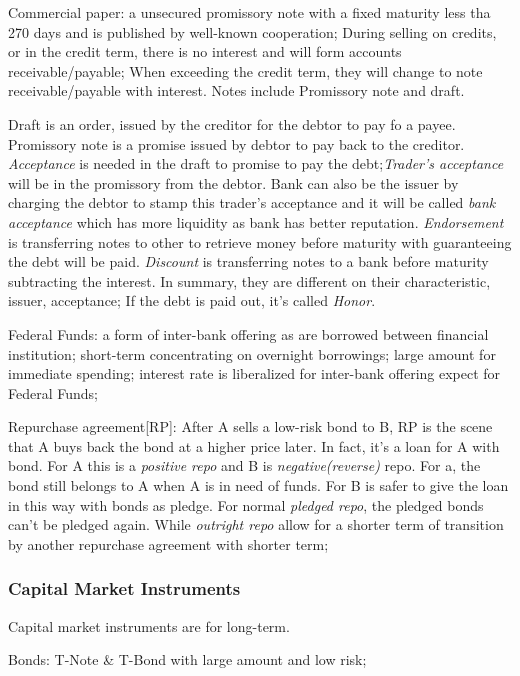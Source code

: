 \documentclass[10pt, a4paper]{article}
\begin{document}
                Commercial paper: a unsecured promissory note with a fixed maturity less tha 270 days and is published by well-known cooperation; During selling on credits, or in the credit term, there is no interest and will form accounts receivable/payable; When exceeding the credit term, they will change to note receivable/payable with interest. Notes include Promissory note and draft.
                
                Draft is an order, issued by the creditor for the debtor to pay fo a payee. Promissory note is a promise issued by debtor to pay back to the creditor. \emph{Acceptance} is needed in the draft to promise to pay the debt;\emph{Trader's acceptance} will be in the promissory from the debtor. Bank can also be the issuer by charging the debtor to stamp this trader's acceptance and it will be called \emph{bank acceptance} which has more liquidity as bank has better reputation. \emph{Endorsement} is transferring notes to other to retrieve money before maturity with guaranteeing the debt will be paid. \emph{Discount} is transferring notes to a bank before maturity subtracting the interest. In summary, they are different on their characteristic, issuer, acceptance; If the debt is paid out, it's called \emph{Honor}. 

                Federal Funds: a form of inter-bank offering as are borrowed between financial institution; short-term concentrating on overnight borrowings; large amount for immediate spending; interest rate is liberalized for inter-bank offering expect for Federal Funds;
                
                Repurchase agreement[RP]: After A sells a low-risk bond to B, RP is the scene that A buys back the bond at a higher price later. In fact, it's a loan for A with bond. For A this is a \emph{positive repo} and B is \emph{negative(reverse)} repo. For a, the bond still belongs to A when A is in need of funds. For B is safer to give the loan in this way with bonds as pledge. For normal \emph{pledged repo}, the pledged bonds can't be pledged again. While \emph{outright repo} allow for a shorter term of transition by another repurchase agreement with shorter term;

            \subsubsection{Capital Market Instruments}
                Capital market instruments are for long-term. 

                Bonds: T-Note \& T-Bond with large amount and low risk; 
\end{document}
